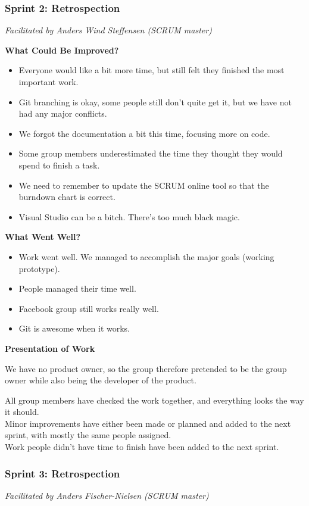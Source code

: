 \subsubsection{Sprint 2: Retrospection}
\label{sec:sprint2}
\small{\textit{Facilitated by Anders Wind Steffensen (SCRUM master)}} 

\textbf{What Could Be Improved?}

\begin{itemize}
	\item Everyone would like a bit more time, but still felt they finished the most important work.
	\item Git branching is okay, some people still don't quite get it, but we have not had any major conflicts.
	\item We forgot the documentation a bit this time, focusing more on code. 
	\item Some group members underestimated the time they thought they would spend to finish a task.
	\item We need to remember to update the SCRUM online tool so that the burndown chart is correct.
	\item Visual Studio can be a bitch. There's too much black magic.
\end{itemize}

\textbf{What Went Well?}

\begin{itemize}
	\item Work went well. We managed to accomplish the major goals (working prototype).
	\item People managed their time well.
	\item Facebook group still works really well.
	\item Git is awesome when it works.
\end{itemize}

\textbf{Presentation of Work}

We have no product owner, so the group therefore pretended to be the group owner while also being the developer of the product.

All group members have checked the work together, and everything looks the way it should.\\
Minor improvements have either been made or planned and added to the next sprint, with mostly the same people assigned.\\
Work people didn't have time to finish have been added to the next sprint.

\subsubsection{Sprint 3: Retrospection}
\label{sec:sprint3}
\small{\textit{Facilitated by Anders Fischer-Nielsen (SCRUM master)}} 

